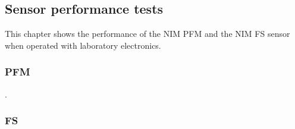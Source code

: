 	

	\newpage
		
	\subsection{Sensor performance tests}
		This chapter shows the performance of the NIM PFM and the NIM FS sensor when operated with laboratory electronics.
		
		\subsubsection{PFM}\label{sec:paper}
		.
		\subsubsection{FS }
	
